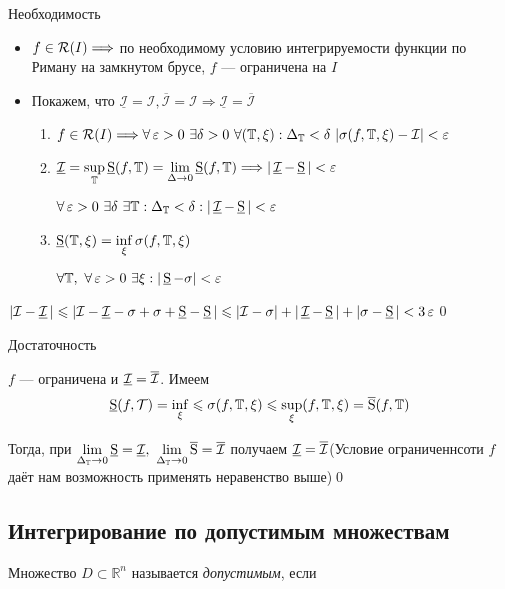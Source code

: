 \proof Необходимость
\begin{itemize}
    \item $f\in\mathcal{R}(I)\Longrightarrow$ по необходимому условию интегрируемости функции по Риману на замкнутом брусе, $f$ — ограничена на $I$
    \item Покажем, что $\underline{\mathcal{I}}=\mathcal{I},\overline{\mathcal{I}}=\mathcal{I}\Longrightarrow\underline{\mathcal{I}}=\overline{\mathcal{I}}$

    \begin{enumerate}
        \item $f\in\riman{I}\Longrightarrow\forall \ve >0\ \exists \delta >0\ \forall(\mathbb{T},\xi):\Delta_{\mathbb{T}}<\delta \ |\sigma(f,\mathbb{T},\xi)-\mathcal{I}|<\ve$
        \item $\operatorname{\underline{\mathcal{I}}}=\sup\limits_{\mathbb{T}}\operatorname{\underline{S}}(f,\operatorname{\mathbb{T}})=\lim\limits_{\Delta\rightarrow 0}\operatorname{\underline{S}}(f,\operatorname{\mathbb{T}}) \Longrightarrow |\operatorname{\underline{\mathcal{I}}}-\operatorname{\underline{S}}|<\operatorname{\varepsilon}$

        $\forall \ve>0\ \exists\delta\ \exists\mathbb{T}:\Delta_{\mathbb{T}}<\delta: |\ui-\us|<\ve$
        \item $\operatorname{\underline{S}}(\mathbb{T},\xi)=\inf\limits_{\xi}\sigma(f,\mathbb{T},\xi)$

        $\forall\mathbb{T},\ \forall \ve>0\ \exists \xi:|\us-\sigma|<\ve$
    \end{enumerate}
\end{itemize}

$|\mathcal{I}-\operatorname{\underline{\mathcal{I}}}|\leqslant|\mathcal{I}-{\operatorname{\underline{\mathcal{I}}}}-\sigma+\sigma+{\operatorname{\underline{S}}}-\operatorname{\underline{S}}|\leqslant|\mathcal{I}-\sigma|+|\operatorname{\underline{\mathcal{I}}}-\operatorname{\underline{S}}|+|\sigma-\operatorname{\underline{S}}|<3\operatorname{\varepsilon}$\qed

\proof Достаточность

$f$ — ограничена и $\operatorname{\underline{\mathcal{I}}}=\operatorname{\overline{\mathcal{I}}}$. Имеем
\begin{equation*}
    \operatorname{\underline{S}}(f,\mathcal{T})=\inf\limits_{\xi}\leqslant\sigma(f,\mathbb{T},\xi)\leqslant \sup\limits_{\xi}(f,\mathbb{T},\xi)=\operatorname{\overline{S}}(f,\mathbb{T})
\end{equation*}

Тогда, при $\lim\limits_{\Delta_{\T}\rightarrow 0} \us=\ui,\ \lim\limits_{\Delta_{\T}\rightarrow0}\os=\oi$ получаем $\operatorname{\underline{\mathcal{I}}}=\operatorname{\overline{\mathcal{I}}}$(Условие ограниченнсоти $f$ даёт нам возможность применять неравенство выше)\qed


\subsection{Интегрирование по допустимым множествам}

 Множество $D\subset\mathbb{R}^n$ называется \textit{допустимым}, если

